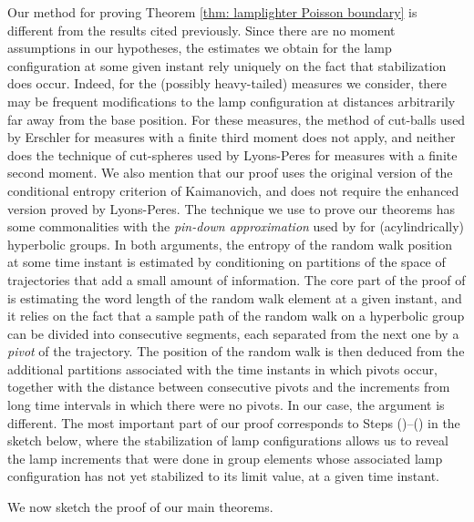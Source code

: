 \documentclass[reqno,oneside,11pt]{amsart}
\theoremstyle{plain}
\theoremstyle{definition}
\newcommand{\prange}[2]{(\labelcref{#1})--(\labelcref{#2})}
\begin{document}
Our method for proving Theorem \ref{thm: lamplighter Poisson boundary} is different from the results cited previously. Since there are no moment assumptions in our hypotheses, the estimates we obtain for the lamp configuration at some given instant rely uniquely on the fact that stabilization does occur. Indeed, for the (possibly heavy-tailed) measures we consider, there may be frequent modifications to the lamp configuration at distances arbitrarily far away from the base position. For these measures, the method of cut-balls used by Erschler for measures with a finite third moment does not apply, and neither does the technique of cut-spheres used by Lyons-Peres for measures with a finite second moment. We also mention that our proof uses the original version of the conditional entropy criterion of Kaimanovich, and does not require the enhanced version proved by Lyons-Peres. The technique we use to prove our theorems has some commonalities with the \emph{pin-down approximation} used by \cite{ChawlaForghaniFrischTiozzo2022} for (acylindrically) hyperbolic groups. In both arguments, the entropy of the random walk position at some time instant is estimated by conditioning on partitions of the space of trajectories that add a small amount of information.  The core part of the proof of \cite[Theorems 1.1 and 1.2]{ChawlaForghaniFrischTiozzo2022} is estimating the word length of the random walk element at a given instant, and it relies on the fact that a sample path of the random walk on a hyperbolic group can be divided into consecutive segments, each separated from the next one by a \emph{pivot} of the trajectory. The position of the random walk is then deduced from the additional partitions associated with the time instants in which pivots occur, together with the distance between consecutive pivots and the increments from long time intervals in which there were no pivots. In our case, the argument is different. The most important part of our proof corresponds to Steps \prange{step: step 7}{step: step 10} in the sketch below, where the stabilization of lamp configurations allows us to reveal the lamp increments that were done in group elements whose associated lamp configuration has not yet stabilized to its limit value, at a given time instant.

We now sketch the proof of our main theorems.

\end{document}
